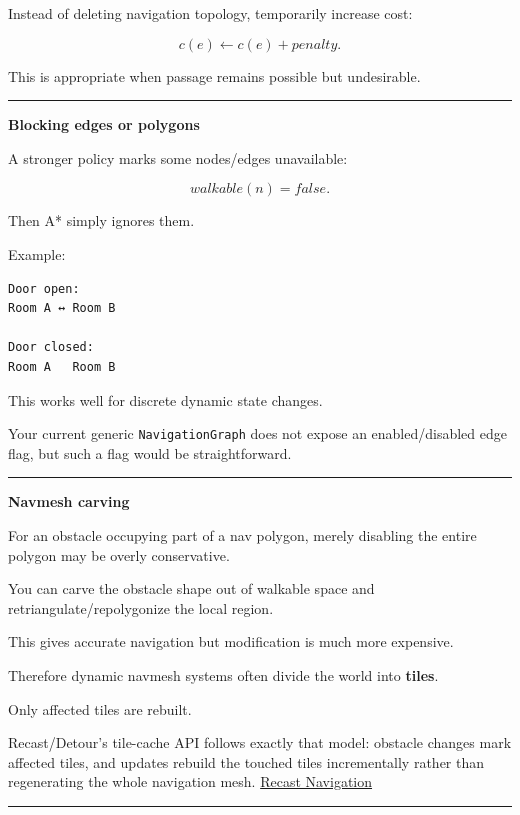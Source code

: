Instead of deleting navigation topology, temporarily increase cost:

\[
c(e)\leftarrow c(e)+penalty.
\]

This is appropriate when passage remains possible but undesirable.

\begin{center}\rule{0.5\linewidth}{0.5pt}\end{center}

\textbf{Blocking edges or polygons}

A stronger policy marks some nodes/edges unavailable:

\[
walkable(n)=false.
\]

Then A* simply ignores them.

Example:

\begin{verbatim}
Door open:
Room A ↔ Room B

Door closed:
Room A   Room B
\end{verbatim}

This works well for discrete dynamic state changes.

Your current generic \texttt{NavigationGraph} does not expose an enabled/disabled edge flag, but such a flag would be straightforward.

\begin{center}\rule{0.5\linewidth}{0.5pt}\end{center}

\textbf{Navmesh carving}

For an obstacle occupying part of a nav polygon, merely disabling the entire polygon may be overly conservative.

You can carve the obstacle shape out of walkable space and retriangulate/repolygonize the local region.

This gives accurate navigation but modification is much more expensive.

Therefore dynamic navmesh systems often divide the world into \textbf{tiles}.

Only affected tiles are rebuilt.

Recast/Detour's tile-cache API follows exactly that model: obstacle changes mark affected tiles, and updates rebuild the touched tiles incrementally rather than regenerating the whole navigation mesh. \href{https://recastnav.com/classdtTileCache.html?utm_source=chatgpt.com}{Recast Navigation}

\begin{center}\rule{0.5\linewidth}{0.5pt}\end{center}

